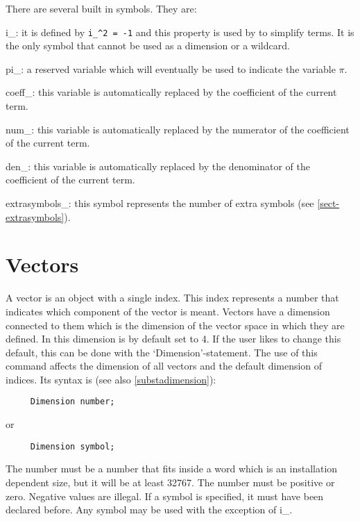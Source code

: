 There are several built in symbols. They are:

\noindent i\_: it is defined by \verb:i_^2 = -1: and this 
property is used by {\FORM} to simplify terms. It is the only symbol that 
cannot be used as a dimension or a wildcard.

\noindent pi\_: a reserved variable which will eventually be 
used to indicate the variable $\pi$.

\noindent coeff\_: this variable is automatically replaced 
by the coefficient of the current term.

\noindent num\_: this variable is automatically replaced by 
the numerator of the coefficient of the current term.

\noindent den\_: this variable is automatically replaced by 
the denominator of the coefficient of the current term.

\noindent extrasymbols\_: this symbol represents the 
number of extra symbols (see \ref{sect-extrasymbols}).

\section{Vectors}

\label{sect-vectors}
A vector is an object with a single index. This 
index represents a number that indicates which component of the vector is 
meant. Vectors have a dimension connected to them which is 
the dimension of the vector space in which they are defined. In {\FORM} 
this dimension is by default set to 4. If the user likes to change this 
default, this can be done with the `Dimension'-statement. The use of this 
command affects the dimension of all vectors and the default dimension of 
indices. Its syntax is (see also \ref{substadimension}):
\begin{verbatim}
     Dimension number;
\end{verbatim}
or
\begin{verbatim}
     Dimension symbol;
\end{verbatim}
The number must be a number that fits inside a {\FORM} word which is 
an installation dependent size, but it will be at least 32767. 
The number must be positive or zero. Negative values are illegal. 
If a symbol is specified, it must have been declared before. Any symbol 
may be used with the exception of i\_. 

